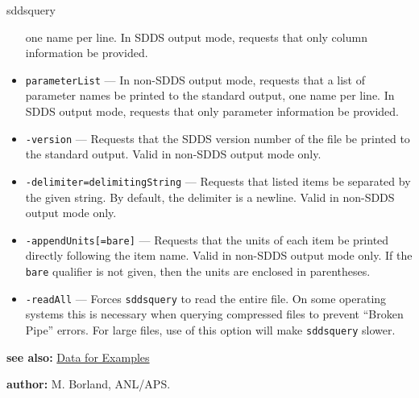 \begin{sddsprog}{sddsquery}
\begin{itemize}
        one name per line. In SDDS output mode, requests that only column information be provided.
      \item \verb|parameterList| --- In non-SDDS output mode, requests that a list of parameter names be printed to the standard
        output, one name per line. In SDDS output mode, requests that only parameter information be provided.
      \item \verb|-version| --- Requests that the SDDS version number of the file be printed to the standard output. Valid in
        non-SDDS output mode only.
      \item \verb|-delimiter=delimitingString| --- Requests that listed items be separated by the given string. By default, the
        delimiter is a newline. Valid in non-SDDS output mode only.
      \item \verb|-appendUnits[=bare]| --- Requests that the units of each item be printed directly following the item name. Valid in
        non-SDDS output mode only. If the \verb|bare| qualifier is not given, then the units are enclosed in parentheses.
      \item \verb|-readAll| --- Forces \verb|sddsquery| to read the entire file. On some operating systems this is necessary when
        querying compressed files to prevent ``Broken Pipe'' errors. For large files, use of this option will make \verb|sddsquery|
        slower.
    \end{itemize}
  \item \textbf{see also:} \hyperref[exampleData]{Data for Examples}
  \item \textbf{author:} M. Borland, ANL/APS.
\end{sddsprog}

